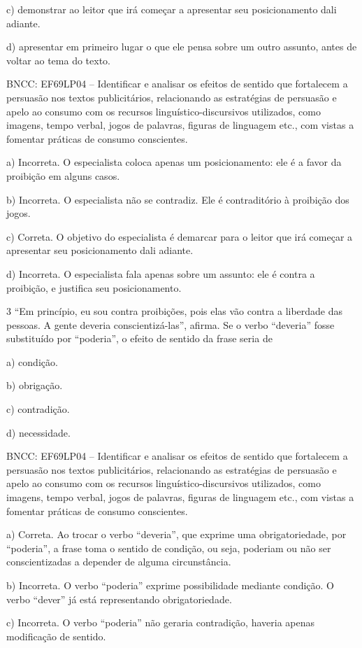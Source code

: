 c) demonstrar ao leitor que irá começar a apresentar seu posicionamento
dali adiante.

d) apresentar em primeiro lugar o que ele pensa sobre um outro assunto,
antes de voltar ao tema do texto.

BNCC: EF69LP04 -- Identificar e analisar os efeitos de sentido que
fortalecem a persuasão nos textos publicitários, relacionando as
estratégias de persuasão e apelo ao consumo com os recursos
linguístico-discursivos utilizados, como imagens, tempo verbal, jogos de
palavras, figuras de linguagem etc., com vistas a fomentar práticas de
consumo conscientes.

a) Incorreta. O especialista coloca apenas um posicionamento: ele é a
favor da proibição em alguns casos.

b) Incorreta. O especialista não se contradiz. Ele é contraditório à
proibição dos jogos.

c) Correta. O objetivo do especialista é demarcar para o leitor que irá
começar a apresentar seu posicionamento dali adiante.

d) Incorreta. O especialista fala apenas sobre um assunto: ele é contra
a proibição, e justifica seu posicionamento.

\num{3} ``Em princípio, eu sou contra proibições, pois elas vão contra a
liberdade das pessoas. A gente deveria conscientizá-las'', afirma. Se o
verbo ``deveria'' fosse substituído por ``poderia'', o efeito de sentido
da frase seria de

a) condição.

b) obrigação.

c) contradição.

d) necessidade.

BNCC: EF69LP04 -- Identificar e analisar os efeitos de sentido que
fortalecem a persuasão nos textos publicitários, relacionando as
estratégias de persuasão e apelo ao consumo com os recursos
linguístico-discursivos utilizados, como imagens, tempo verbal, jogos de
palavras, figuras de linguagem etc., com vistas a fomentar práticas de
consumo conscientes.

a) Correta. Ao trocar o verbo ``deveria'', que exprime uma
obrigatoriedade, por ``poderia'', a frase toma o sentido de condição, ou
seja, poderiam ou não ser conscientizadas a depender de alguma
circunstância.

b) Incorreta. O verbo ``poderia'' exprime possibilidade mediante
condição. O verbo ``dever'' já está representando obrigatoriedade.

c) Incorreta. O verbo ``poderia'' não geraria contradição, haveria
apenas modificação de sentido.

